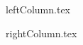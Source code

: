 \documentclass[10pt,a4paper]{article}
\begin{document}
\setlength{\columnsep}{2.2em}
\setlength{\columnseprule}{4pt}
\begin{paracol}{2}

\begin{leftcolumn}
{leftColumn.tex}
\end{leftcolumn}

\begin{rightcolumn}
{rightColumn.tex}
\end{rightcolumn}
\end{paracol}
\end{document}
